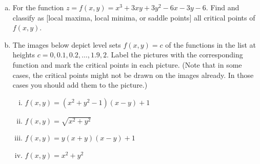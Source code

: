 \begin{question}[M200 2010A] %
\begin{enumerate}[(a)]
\item
For the function $z = f (x, y) = x^3 + 3xy + 3y^2 - 6x - 3y - 6$.
Find and classify as [local maxima, local minima, or saddle points] all critical points of
$f(x, y)$.
\item
The images below depict level sets $f (x, y) = c$ of the functions in the list at heights
$c = 0, 0.1, 0.2, \ldots , 1.9, 2$.
Label the pictures with the corresponding function and mark the critical points in each
picture. (Note that in some cases, the critical points might not be drawn on the images
already. In those cases you should add them to the picture.)
\begin{enumerate}[(i)]
\item
$f(x, y) = (x^2 + y^2 - 1)(x - y) + 1$
\item
$f(x, y) = \sqrt{x^2 + y^2}$
\item
$f(x, y) = y(x + y)(x - y) + 1$
\item
$f(x, y) = x^2 + y^2$
\end{enumerate}

\end{enumerate}


\end{question}
